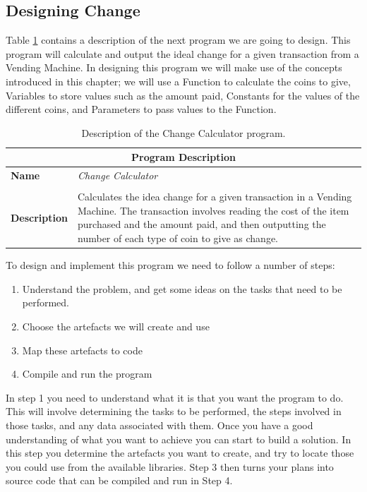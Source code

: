 \subsection{Designing Change} %
\label{sub:designing_simple_change}

Table \ref{tbl:storing-data-prog} contains a description of the next program we are going to design. This program will calculate and output the ideal change for a given transaction from a Vending Machine. In designing this program we will make use of the concepts introduced in this chapter; we will use a Function to calculate the coins to give, Variables to store values such as the amount paid, Constants for the values of the different coins, and Parameters to pass values to the Function.

\begin{table}[h]
\centering
\begin{tabular}{l|p{10cm}}
  \hline
  \multicolumn{2}{c}{\textbf{Program Description}} \\
  \hline
  \textbf{Name} & \emph{Change Calculator} \\
  \\
  \textbf{Description} & Calculates the idea change for a given transaction in a Vending Machine. The transaction involves reading the cost of the item purchased and the amount paid, and then outputting the number of each type of coin to give as change.\\
  \hline
\end{tabular}
\caption{Description of the Change Calculator program.}
\label{tbl:storing-data-prog}
\end{table}


To design and implement this program we need to follow a number of steps:
\begin{enumerate}
  \item Understand the problem, and get some ideas on the tasks that need to be performed.
  \item Choose the artefacts we will create and use
  \item Map these artefacts to code
  \item Compile and run the program
\end{enumerate}

In step 1 you need to understand what it is that you want the program to do. This will involve determining the tasks to be performed, the steps involved in those tasks, and any data associated with them. Once you have a good understanding of what you want to achieve you can start to build a solution. In this step you determine the artefacts you want to create, and try to locate those you could use from the available libraries. Step 3 then turns your plans into source code that can be compiled and run in Step 4. 


